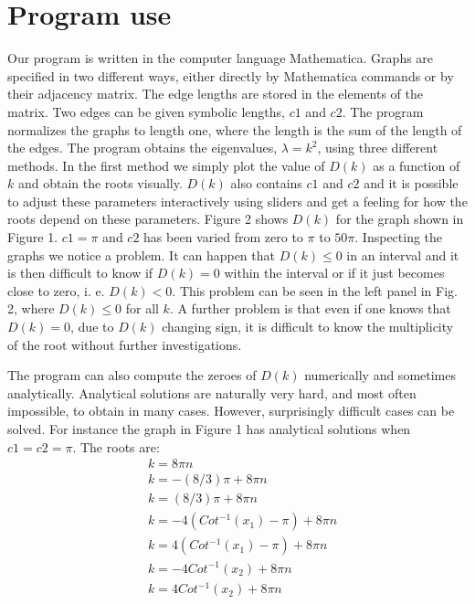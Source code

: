 \documentclass[a4paper]{article}
\begin{document}
\section{Program use}
Our program is written in the computer language Mathematica. Graphs are specified in two different ways, either directly by Mathematica commands or by their adjacency matrix. The edge lengths are stored in the elements of the matrix. Two edges can be given symbolic lengths, $c1$ and $c2$. The program normalizes the graphs to length one, where the length is the sum of the length of the edges. The program obtains the eigenvalues, $\lambda=k^2$, using three different methods. In the first method we simply plot the value of $D(k)$ as a function of $k$ and obtain the roots visually. $D(k)$ also contains $c1$ and $c2$ and it is possible to adjust these parameters interactively using sliders and get a feeling for how the roots depend on these parameters. Figure 2 shows $D(k)$ for the graph shown in Figure 1. $c1=\pi$ and $c2$ has been varied from zero to $\pi$ to $50\pi$. Inspecting the graphs we notice a problem. It can happen that $D(k)\leq 0$ in an interval and it is then difficult to know if  $D(k)=0$ within the interval or if it just becomes close to zero, i. e. $D(k) < 0$. This problem can be seen in the left panel in Fig. 2, where $D(k) \leq 0$ for all $k$. A further problem is that even if one knows that $D(k)=0$, due to  $D(k)$ changing sign, it is difficult to know the multiplicity of the root without further investigations.

The program can also compute the zeroes of $D(k)$ numerically and sometimes analytically. Analytical solutions are naturally very hard, and most often impossible, to obtain in many cases. However, surprisingly difficult cases can be solved. For instance the graph in Figure 1 has analytical solutions when $c1=c2=\pi$. The roots are:
\begin{align}
&k=8 \pi n \nonumber \\ 
&k= -(8/3) \pi+ 8 \pi n \nonumber \\
&k=(8/3) \pi+ 8 \pi n \nonumber \\
&k=-4 (Cot^{-1}(x_1) -\pi) + 8 \pi n \\
&k=4 (Cot^{-1}(x_1) -\pi) + 8 \pi n \nonumber \\ 
&k=-4 Cot^{-1}(x_2) + 8 \pi n \nonumber \\
&k=4 Cot^{-1}(x_2) + 8 \pi n \nonumber
\end{align}
\end{document}
